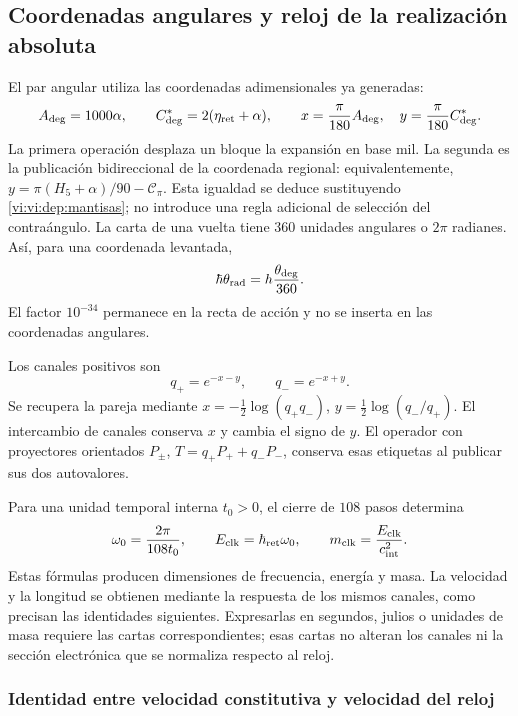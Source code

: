 \subsection{Coordenadas angulares y reloj de la realización absoluta}
\label{vi:vi:dep:reloj}

El par angular utiliza las coordenadas adimensionales ya generadas:
\begin{equation}
 A_{\deg}=1000\alpha,\qquad
 C^*_{\deg}=2(\eta_{\rm ret}+\alpha),\qquad
 x=\frac{\pi}{180}A_{\deg},\quad
 y=\frac{\pi}{180}C^*_{\deg}.
 \label{vi:vi:dep:angulos}
\end{equation}
La primera operación desplaza un bloque la expansión en base mil.
La segunda es la publicación bidireccional de la coordenada regional:
equivalentemente,
\(y=\pi(H_5+\alpha)/90-\mathcal C_\pi\).
Esta igualdad se deduce sustituyendo \eqref{vi:vi:dep:mantisas}; no
introduce una regla adicional de selección del contraángulo.
La carta de una vuelta tiene \(360\) unidades angulares o \(2\pi\)
radianes. Así, para una coordenada levantada,
\[
 \hbar\theta_{\rm rad}
 =h\frac{\theta_{\deg}}{360}.
\]
El factor \(10^{-34}\) permanece en la recta de acción y no se
inserta en las coordenadas angulares.

Los canales positivos son
\[
 q_+=e^{-x-y},\qquad q_-=e^{-x+y}.
\]
Se recupera la pareja mediante
\(x=-\tfrac12\log(q_+q_-)\),
\(y=\tfrac12\log(q_-/q_+)\). El intercambio de canales conserva
\(x\) y cambia el signo de \(y\). El operador con proyectores
orientados \(P_\pm\),
\(T=q_+P_++q_-P_-\), conserva esas etiquetas al publicar sus dos
autovalores.

Para una unidad temporal interna \(t_0>0\), el cierre de \(108\)
pasos determina
\begin{equation}
 \omega_0=\frac{2\pi}{108t_0},\qquad
 E_{\rm clk}=\hbar_{\rm ret}\omega_0,
 \qquad m_{\rm clk}=\frac{E_{\rm clk}}{c_{\rm int}^{2}}.
 \label{vi:vi:dep:reloj-absoluto}
\end{equation}
Estas fórmulas producen dimensiones de frecuencia, energía y masa.
La velocidad y la longitud se obtienen mediante la respuesta de los
mismos canales, como precisan las identidades siguientes. Expresarlas
en segundos, julios o unidades de masa requiere las cartas
correspondientes; esas cartas no alteran los canales ni la sección
electrónica que se normaliza respecto al reloj.

\subsubsection{Identidad entre velocidad constitutiva y velocidad del reloj}

